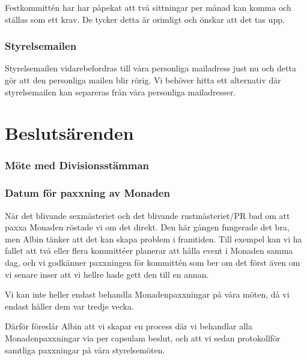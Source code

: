\documentclass[protokoll]{dvd}
\begin{document}
Festkommittén har har påpekat att två sittningar per månad kan komma och ställas som ett krav. De tycker detta är orimligt och önskar att det tas upp.


\subsubsection{Styrelsemailen}

Styrelsemailen vidarebefordras till våra personliga mailadress just nu och detta gör att den personliga mailen blir rörig. Vi behöver hitta ett alternativ där styrelsemailen kan separeras från våra personliga mailadresser.










\newpage

\section{Beslutsärenden}


\subsubsection{Möte med Divisionsstämman}

\subsubsection{Datum för paxxning av Monaden}

När det blivande sexmästeriet och det blivande rustmästeriet/PR bad om att paxxa Monaden röstade vi om det direkt. Den här gången fungerade det bra, men Albin tänker att det kan skapa problem i framtiden. Till exempel kan vi ha fallet att två eller flera kommittéer planerar att hålla event i Monaden samma dag, och vi godkänner paxxningen för kommittén som ber om det först även om vi senare inser att vi hellre hade gett den till en annan.

Vi kan inte heller endast behandla Monadenpaxxningar på våra möten, då vi endast håller dem var tredje vecka.

Därför föreslår Albin att vi skapar en process där vi behandlar alla Monadenpaxxningar via per capsulam beslut, och att vi sedan protokollför samtliga paxxningar på våra styrelsemöten.
\end{document}
